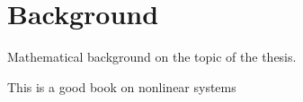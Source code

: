 

\chapter{Background}
Mathematical background on the topic of the thesis.

This is a good book on nonlinear systems \cite{ulin}

